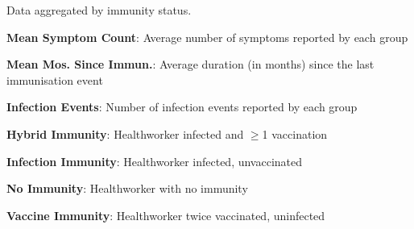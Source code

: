 \documentclass[11pt]{article}
\begin{document}
\begin{table}[h]
\caption{\protect\hyperlink{file-table-0-pkl}{Summary Statistics of Infection Events, Mean Symptoms and Months Since Last Immunisation}}
\label{table:summary_stats}
\begin{threeparttable}
\renewcommand{\TPTminimum}{\linewidth}
\begin{tablenotes}
\footnotesize
\item Data aggregated by immunity status.
\item \textbf{Mean Symptom Count}: Average number of symptoms reported by each group
\item \textbf{Mean Mos. Since Immun.}: Average duration (in months) since the last immunisation event
\item \textbf{Infection Events}: Number of infection events reported by each group
\item \textbf{Hybrid Immunity}: Healthworker infected and $\geq$1 vaccination
\item \textbf{Infection Immunity}: Healthworker infected, unvaccinated
\item \textbf{No Immunity}: Healthworker with no immunity
\item \textbf{Vaccine Immunity}: Healthworker twice vaccinated, uninfected
\end{tablenotes}
\end{threeparttable}
\end{table}
\end{document}
